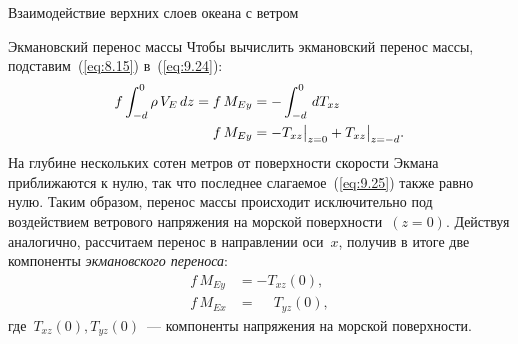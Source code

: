\begin{chapter}{Взаимодействие верхних слоев океана с ветром}
\begin{section}{Экмановский перенос массы}
Чтобы вычислить экмановский перенос массы,
подставим~(\ref{eq:8.15}) в~(\ref{eq:9.24}):
\begin{align}
f\int_{-d}^0\rho\,V_E\,dz =f\,M_{Ey} &=-\int_{-d}^0 \,d T_{xz}   \notag \\
f\,M_{Ey} &=-T_{xz}\big|_{z=0} + T_{xz}\big|_{z=-d}.\label{eq:9.25}
\end{align}
На глубине нескольких сотен метров от поверхности скорости Экмана приближаются
к нулю, так что последнее слагаемое~(\ref{eq:9.25}) также равно нулю. Таким
образом, перенос массы происходит 
исключительно под воздействием ветрового 
напряжения 
на морской поверхности~$(z = 0)$. Действуя аналогично, рассчитаем перенос
в направлении оси~$x$, получив в итоге две 
компоненты \textit{экмановского переноса}:
\begin{subequations}\label{eq:9.26}
\begin{align}
 f\,M_{Ey} &= -T_{xz}(0), \\
 f\,M_{Ex} &= \phantom{-}T_{yz}(0),
\end{align}
\end{subequations}
где~$T_{xz}(0), T_{yz}(0)$~--- компоненты напряжения на морской поверхности.
%


\end{section}
\end{chapter}
